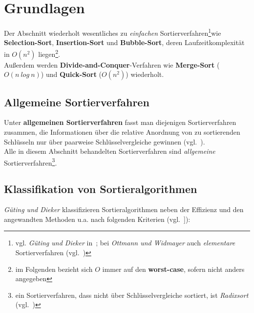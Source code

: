 \section{Grundlagen}

Der Abschnitt wiederholt wesentliches zu \textit{einfachen} Sortierverfahren\footnote{
    vgl. \textit{Güting und Dieker} in~\cite[170]{GD18e}; bei \textit{Ottmann und Widmayer} auch \textit{elementare} Sortierverfahren (vgl.~\cite[82 ff.]{OW17b})
}wie \textbf{Selection-Sort}, \textbf{Insertion-Sort} und \textbf{Bubble-Sort}, deren Laufzeitkomplexität in $O(n^2)$ liegen\footnote{
im Folgenden bezieht sich $O$ immer auf den \textbf{worst-case}, sofern nicht anders angegeben
}.\\
Außerdem werden \textbf{Divide-and-Conquer}-Verfahren wie \textbf{Merge-Sort} ($O(n\ log\ n)$) und \textbf{Quick-Sort} ($O(n^2)$) wiederholt.

\subsection{Allgemeine Sortierverfahren}
Unter \textbf{allgemeinen Sortierverfahren} fasst man diejenigen Sortierverfahren zusammen, die Informationen über die relative Anordnung von zu sortierenden Schlüsseln nur über paarweise Schlüsselvergleiche gewinnen (vgl.~\cite[130]{OW17b}).\\
Alle in diesem Abschnitt behandelten Sortierverfahren sind \textit{allgemeine} Sortierverfahren\footnote{
ein Sortierverfahren, dass nicht über Schlüsselvergleiche sortiert, ist \textit{Radixsort} (vgl.~\cite[121]{OW17b})
}.

\subsection{Klassifikation von Sortieralgorithmen}

\textit{Güting und Dieker} klassifizieren Sortieralgorithmen neben der Effizienz und den angewandten Methoden u.a. nach folgenden Kriterien (vgl.~\cite[169 f.]{GD18e}]):

